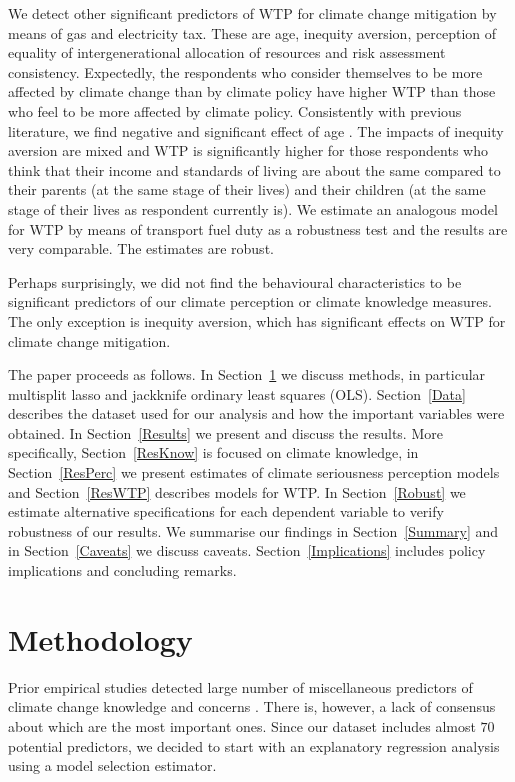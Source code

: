 \documentclass[a4paper,12pt]{article}
\begin{document}
We detect other significant predictors of WTP for climate change mitigation by means of gas and electricity tax. These are age, inequity aversion, perception of equality of intergenerational allocation of resources and risk assessment consistency. Expectedly, the respondents who consider themselves to be more affected by climate change than by climate policy have higher WTP than those who feel to be more affected by climate policy. Consistently with previous literature, we find negative and significant effect of age \citep{Hamilton2011, Kellstedt2008, Hayes2001gender}. The impacts of inequity aversion are mixed and WTP is significantly higher for those respondents who think that their income and standards of living are about the same compared to their parents (at the same stage of their lives) and their children (at the same stage of their lives as respondent currently is). We estimate an analogous model for WTP by means of transport fuel duty as a robustness test and the results are very comparable. The estimates are robust.


Perhaps surprisingly, we did not find the behavioural characteristics to be significant predictors of our climate perception or climate knowledge measures. The only exception is inequity aversion, which has significant effects on WTP for climate change mitigation.




The paper proceeds as follows. In Section~\ref{Method} we discuss methods, in particular multisplit lasso and jackknife ordinary least squares (OLS). Section~\ref{Data} describes the dataset used for our analysis and how the important variables were obtained. In Section~\ref{Results} we present and discuss the results. More specifically, Section~\ref{ResKnow} is focused on climate knowledge, in Section~\ref{ResPerc} we present estimates of climate seriousness perception models and Section~\ref{ResWTP} describes models for WTP. In Section~\ref{Robust} we estimate alternative specifications for each dependent variable to verify robustness of our results. We summarise our findings in Section~\ref{Summary} and in Section~\ref{Caveats} we discuss caveats. Section~\ref{Implications} includes policy implications and concluding remarks.


\FloatBarrier
\section{Methodology}\label{Method}

Prior empirical studies detected large number of miscellaneous predictors of climate change knowledge and concerns \citetext{e.g. \citealt*{Leiserowitz2015, Hamilton2011, McCright2010, Morrison2015}}. There is, however, a lack of consensus about which are the most important ones. Since our dataset includes almost $70$ potential predictors, we decided to start with an explanatory regression analysis using a model selection estimator.
\end{document}
